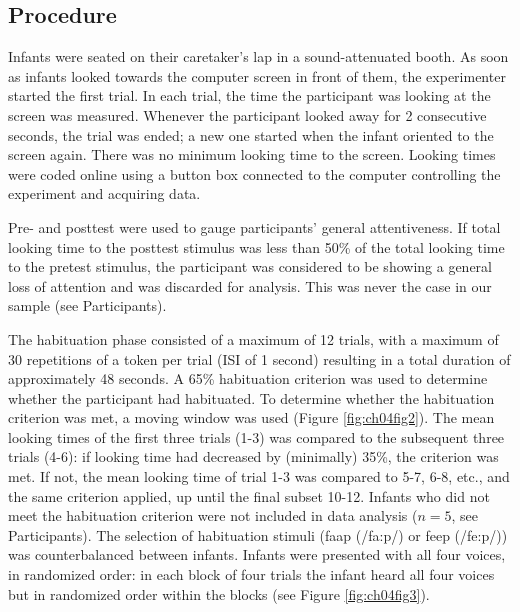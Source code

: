 \documentclass[openright,titlepage,12pt,a4paper]{book}
\begin{document}
\hypertarget{procedure}{%
\subsection{Procedure}\label{procedure}}

Infants were seated on their caretaker's lap in a sound-attenuated booth. As soon as infants looked towards the computer screen in front of them, the experimenter started the first trial. In each trial, the time the participant was looking at the screen was measured. Whenever the participant looked away for 2 consecutive seconds, the trial was ended; a new one started when the infant oriented to the screen again. There was no minimum looking time to the screen. Looking times were coded online using a button box connected to the computer controlling the experiment and acquiring data.

Pre- and posttest were used to gauge participants' general attentiveness. If total looking time to the posttest stimulus was less than 50\% of the total looking time to the pretest stimulus, the participant was considered to be showing a general loss of attention and was discarded for analysis. This was never the case in our sample (see Participants).

The habituation phase consisted of a maximum of 12 trials, with a maximum of 30 repetitions of a token per trial (ISI of 1 second) resulting in a total duration of approximately 48 seconds. A 65\% habituation criterion was used to determine whether the participant had habituated. To determine whether the habituation criterion was met, a moving window was used (Figure \ref{fig:ch04fig2}). The mean looking times of the first three trials (1-3) was compared to the subsequent three trials (4-6): if looking time had decreased by (minimally) 35\%, the criterion was met. If not, the mean looking time of trial 1-3 was compared to 5-7, 6-8, etc., and the same criterion applied, up until the final subset 10-12. Infants who did not meet the habituation criterion were not included in data analysis (\(n = 5\), see Participants). The selection of habituation stimuli (faap (/fa:p/) or feep (/fe:p/)) was counterbalanced between
infants. Infants were presented with all four voices, in randomized order: in each block of four trials the infant heard all four voices but in randomized order within the blocks (see Figure \ref{fig:ch04fig3}).
\end{document}
